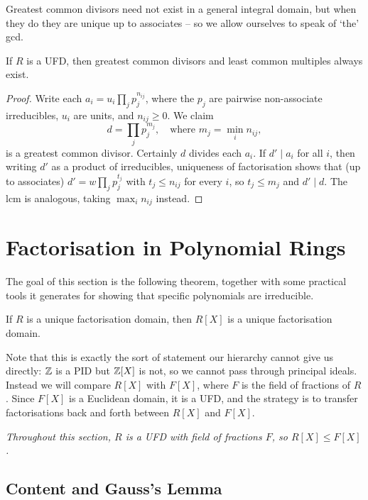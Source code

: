 \documentclass[a4paper]{scrartcl}
\begin{document}
Greatest common divisors need not exist in a general integral domain, but when they do they are unique up to associates -- so we allow ourselves to speak of `the' gcd.

\begin{proposition}
	If $R$ is a UFD, then greatest common divisors and least common multiples always exist.
\end{proposition}
\begin{proof}
	Write each $a_i = u_i \prod_j p_j^{n_{ij}}$, where the $p_j$ are pairwise non-associate irreducibles, $u_i$ are units, and $n_{ij} \geq 0$. We claim
	$$
	d = \prod_j p_j^{m_j}, \quad \text{where } m_j = \min_i n_{ij},
	$$
	is a greatest common divisor. Certainly $d$ divides each $a_i$. If $d' \mid a_i$ for all $i$, then writing $d'$ as a product of irreducibles, uniqueness of factorisation shows that (up to associates) $d' = w\prod_j p_j^{t_j}$ with $t_j \leq n_{ij}$ for every $i$, so $t_j \leq m_j$ and $d' \mid d$. The lcm is analogous, taking $\max_i n_{ij}$ instead.
\end{proof}

\section{Factorisation in Polynomial Rings}

The goal of this section is the following theorem, together with some practical tools it generates for showing that specific polynomials are irreducible.

\begin{theorem}
	If $R$ is a unique factorisation domain, then $R[X]$ is a unique factorisation domain.
\end{theorem}

Note that this is exactly the sort of statement our hierarchy cannot give us directly: $\mathbb{Z}$ is a PID but $\mathbb{Z}[X]$ is not, so we cannot pass through principal ideals. Instead we will compare $R[X]$ with $F[X]$, where $F$ is the field of fractions of $R$. Since $F[X]$ is a Euclidean domain, it is a UFD, and the strategy is to transfer factorisations back and forth between $R[X]$ and $F[X]$.

\emph{Throughout this section, $R$ is a UFD with field of fractions $F$, so $R[X] \leq F[X]$.}

\subsection{Content and Gauss's Lemma}
\end{document}
